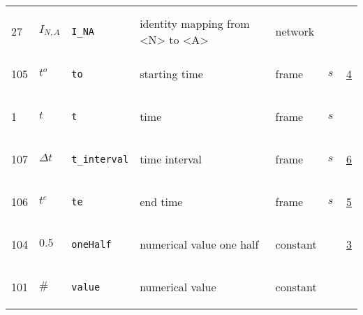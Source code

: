 \begin{longtable}{|p{1cm}|p{2.5cm}|p{4.5cm}|p{8cm}|p{3.0cm}|p{3cm}|p{1cm}|}
             & $  $
             & \\
            27
             & \hypertarget{"v:27"}{ $ {{I}}{_{N, A}} $}
             & \verb|I_NA|
             & identity mapping from <N> to <A>
             & \begin{lay}network \end{lay}
             & $  $
             & \\
            105
             & \hypertarget{"v:105"}{ $ {{t^o}}{_{}} $}
             & \verb|to|
             & starting time
             & \begin{lay}frame \end{lay}
             & $ s \, $
             &                 \hyperlink{"e:4"}{ 4 }
                 \\
            1
             & \hypertarget{"v:1"}{ $ {t}{_{}} $}
             & \verb|t|
             & time
             & \begin{lay}frame \end{lay}
             & $ s \, $
             & \\
            107
             & \hypertarget{"v:107"}{ $ {{\Delta t}}{_{}} $}
             & \verb|t_interval|
             & time interval
             & \begin{lay}frame \end{lay}
             & $ s \, $
             &                 \hyperlink{"e:6"}{ 6 }
                 \\
            106
             & \hypertarget{"v:106"}{ $ {{t^e}}{_{}} $}
             & \verb|te|
             & end time
             & \begin{lay}frame \end{lay}
             & $ s \, $
             &                 \hyperlink{"e:5"}{ 5 }
                 \\
            104
             & \hypertarget{"v:104"}{ $ {0.5}{_{}} $}
             & \verb|oneHalf|
             & numerical value one half
             & \begin{lay}constant \end{lay}
             & $  $
             &                 \hyperlink{"e:3"}{ 3 }
                 \\
            101
             & \hypertarget{"v:101"}{ $ {{\#}}{_{}} $}
             & \verb|value|
             & numerical value
             & \begin{lay}constant \end{lay}
             & $  $
             & \\

\end{longtable}
